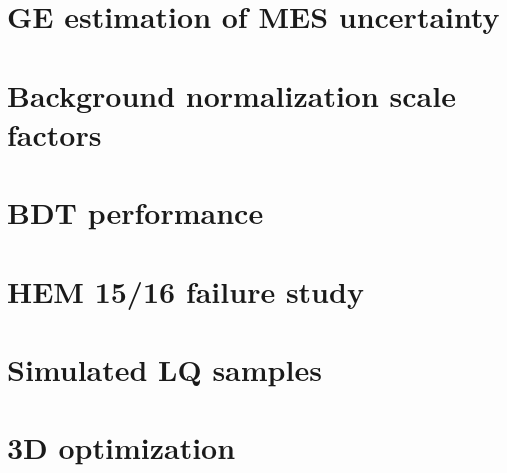 \documentclass[thesis]{neu}
\begin{document}

    
\clearpage
\appendix
\chapter{GE estimation of MES uncertainty} \label{app:GEScaleSyst}


\clearpage
\chapter{Background normalization scale factors} \label{app:SFStudy}


\clearpage
\chapter{BDT performance} \label{app:BDTPerformance}


\clearpage
\chapter{HEM 15/16 failure study} \label{app:HEMFailure}


\clearpage
\chapter{Simulated LQ samples} \label{app:SimLQSamples}


\clearpage
\chapter{3D optimization} \label{app:3DOptimization}

\end{document}
